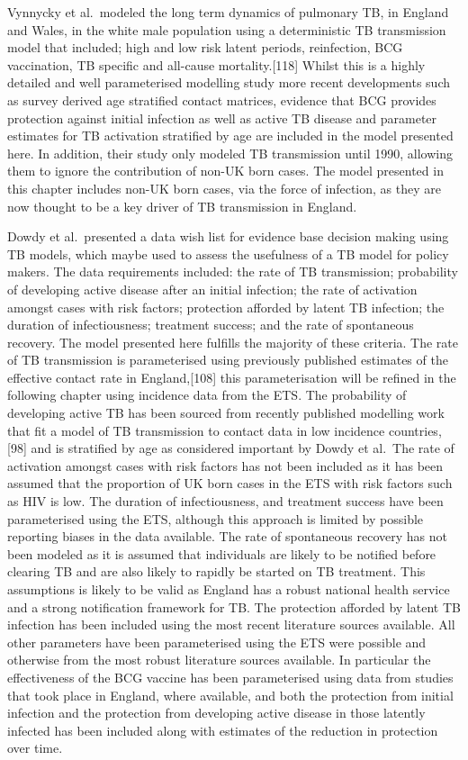 \documentclass[11pt,twoside]{bristolthesis}
\begin{document}
  Vynnycky et al.~modeled the long term dynamics of pulmonary TB, in England and Wales, in the white male population using a deterministic TB transmission model that included; high and low risk latent periods, reinfection, BCG vaccination, TB specific and all-cause mortality.{[}118{]} Whilst this is a highly detailed and well parameterised modelling study more recent developments such as survey derived age stratified contact matrices, evidence that BCG provides protection against initial infection as well as active TB disease and parameter estimates for TB activation stratified by age are included in the model presented here. In addition, their study only modeled TB transmission until 1990, allowing them to ignore the contribution of non-UK born cases. The model presented in this chapter includes non-UK born cases, via the force of infection, as they are now thought to be a key driver of TB transmission in England.
  
  Dowdy et al.~presented a data wish list for evidence base decision making using TB models, which maybe used to assess the usefulness of a TB model for policy makers. The data requirements included: the rate of TB transmission; probability of developing active disease after an initial infection; the rate of activation amongst cases with risk factors; protection afforded by latent TB infection; the duration of infectiousness; treatment success; and the rate of spontaneous recovery. The model presented here fulfills the majority of these criteria. The rate of TB transmission is parameterised using previously published estimates of the effective contact rate in England,{[}108{]} this parameterisation will be refined in the following chapter using incidence data from the ETS. The probability of developing active TB has been sourced from recently published modelling work that fit a model of TB transmission to contact data in low incidence countries,{[}98{]} and is stratified by age as considered important by Dowdy et al.~The rate of activation amongst cases with risk factors has not been included as it has been assumed that the proportion of UK born cases in the ETS with risk factors such as HIV is low. The duration of infectiousness, and treatment success have been parameterised using the ETS, although this approach is limited by possible reporting biases in the data available. The rate of spontaneous recovery has not been modeled as it is assumed that individuals are likely to be notified before clearing TB and are also likely to rapidly be started on TB treatment. This assumptions is likely to be valid as England has a robust national health service and a strong notification framework for TB. The protection afforded by latent TB infection has been included using the most recent literature sources available. All other parameters have been parameterised using the ETS were possible and otherwise from the most robust literature sources available. In particular the effectiveness of the BCG vaccine has been parameterised using data from studies that took place in England, where available, and both the protection from initial infection and the protection from developing active disease in those latently infected has been included along with estimates of the reduction in protection over time.
  
\end{document}
